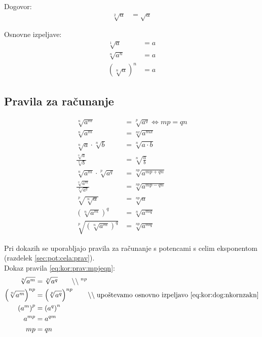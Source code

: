 \documentclass[a4paper,oneside,12pt,fleqn]{article}
\newcommand\krat\cdot
\newcommand{\comment}[1]{\ensuremath{\qquad\backslash\backslash\;}\textnormal{#1}}
\renewcommand\iff\Leftrightarrow
\numberwithin{equation}{section}
\begin{document}
Dogovor:
\begin{align*}
  \sqrt[2]{a} &= \sqrt{a}
\end{align*}

Osnovne izpeljave:
\begin{align}
  \sqrt[1]{a} &= a \nonumber \\
  \sqrt[n]{a^n} &= a \label{eq:kor:dog:nkorn} \\
  \left(\sqrt[n]{a}\right)^n &= a \label{eq:kor:dog:nkornzakn}
\end{align}

\subsection{Pravila za računanje}
\label{sec:kor:prav}
\begin{align}
  \sqrt[n]{a^m} &= \sqrt[p]{a^q} \iff mp = qn \label{eq:kor:prav:mpjeqn} \\
  \sqrt[n]{a^m} &= \sqrt[nx]{a^{mx}} \label{eq:kor:prav:razsirjanje} \\ 
  \sqrt[n]{a} \krat \sqrt[n]{b} &= \sqrt[n]{a \krat b} \label{eq:kor:prav:prodenakkor} \\
  \frac{\sqrt[n]{a}}{\sqrt[n]{b}} &= \sqrt[n]{\frac{a}{b}} \label{eq:kor:prav:ulenakkor} \\
  \sqrt[n]{a^m} \krat \sqrt[p]{a^q} &= \sqrt[np]{a^{mp+qn}} \label{eq:kor:prav:prodkor} \\
  \frac{\sqrt[n]{a^m}}{\sqrt[p]{a^q}} &= \sqrt[np]{a^{mp-qn}} \label{eq:kor:prav:kvockor} \\
  \sqrt[p]{\sqrt[n]{a}} &= \sqrt[np]{a} \label{eq:kor:prav:korkor} \\
  \left( \sqrt[n]{a^m} \right)^q &= \sqrt[n]{a^{mq}}  \label{eq:kor:prav:koranannaq} \\
  \sqrt[p]{\left( \sqrt[n]{a^m} \right)^q} &= \sqrt[np]{a^{mq}} \label{eq:kor:prav:korkoranannaq}
\end{align}

Pri dokazih se uporabljajo pravila za računanje s potencami s celim eksponentom (razdelek
\ref{sec:pot:cela:prav}).\\[5pt]
Dokaz pravila \ref{eq:kor:prav:mpjeqn}:
\begin{align*}
  \sqrt[n]{a^m} &= \sqrt[p]{a^q} \comment{$^{np}$} \\
  \left(\sqrt[n]{a^m}\right)^{np} &= \left(\sqrt[p]{a^q} \right)^{np} \comment{upoštevamo
  osnovno izpeljavo \eqref{eq:kor:dog:nkornzakn}} \\
  \left( a^m \right)^p &= \left( a^q \right)^n \\
  a^{mp} &= a^{qm} \\
  mp &= qn
\end{align*}
\end{document}
